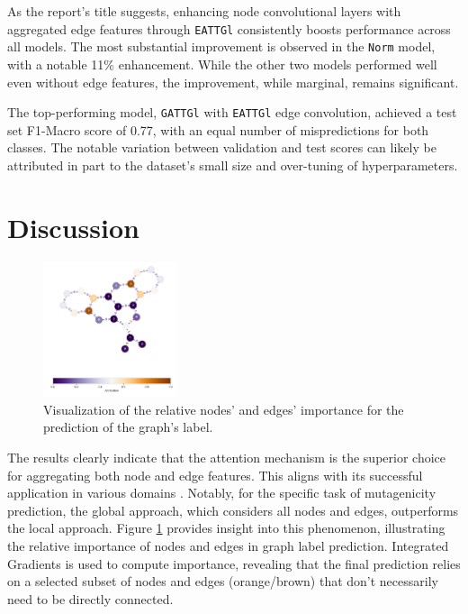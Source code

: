 \documentclass[10pt,twocolumn]{article}
\begin{document}
As the report's title suggests, enhancing node convolutional layers with aggregated edge features through \texttt{EATTGl} 
consistently boosts performance across all models. The most substantial improvement is observed in the \texttt{Norm} model, 
with a notable 11\% enhancement. While the other two models performed well even without edge features, 
the improvement, while marginal, remains significant.

The top-performing model, \texttt{GATTGl} with \texttt{EATTGl} edge convolution, 
achieved a test set F1-Macro score of 0.77, with an equal number of mispredictions for both classes. 
The notable variation between validation and test scores can likely be attributed in part to the dataset's small 
size and over-tuning of hyperparameters.

\section{Discussion}

\begin{figure}[!ht]
    \centering
    \includegraphics[width=0.35\textwidth]{figures/interpret.png}
    \caption{Visualization of the relative nodes' and edges' importance for the prediction of the graph's label.}
    \label{fig:attribution}
\end{figure}

The results clearly indicate that the attention mechanism is the superior choice for aggregating both node and edge features. 
This aligns with its successful application in various domains \cite{transformers}. 
Notably, for the specific task of mutagenicity prediction, the global approach, which considers all nodes and edges, outperforms the local approach. 
Figure \ref{fig:attribution} provides insight into this phenomenon, illustrating the relative importance of nodes and edges in graph label prediction. 
Integrated Gradients \cite{attribution} is used to compute importance, revealing that the final prediction relies on a selected subset of nodes and edges (orange/brown) 
that don't necessarily need to be directly connected.
\end{document}
